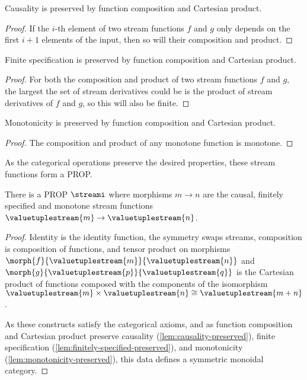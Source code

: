 \begin{lemma}\label{lem:causality-preserved}
    Causality is preserved by function composition and Cartesian product.
\end{lemma}
\begin{proof}
    If the \(i\)-th element of two stream functions \(f\) and \(g\) only depends
    on the first \(i+1\) elements of the input, then so will their composition
    and product.
\end{proof}

\begin{lemma}\label{lem:finitely-specified-preserved}
    Finite specification is preserved by function composition and Cartesian
    product.
\end{lemma}
\begin{proof}
    For both the composition and product of two stream functions \(f\) and
    \(g\), the largest the set of stream derivatives could be is the product of
    stream derivatives of \(f\) and \(g\), so this will also be finite.
\end{proof}

\begin{lemma}\label{lem:monotonicity-preserved}
    Monotonicity is preserved by function composition and Cartesian product.
\end{lemma}
\begin{proof}
    The composition and product of any monotone function is monotone.
\end{proof}

As the categorical operations preserve the desired properties, these stream
functions form a PROP.

\begin{proposition}
    There is a PROP \(\streami\) where morphisms \(m \to n\) are the causal,
    finitely specified and monotone stream functions \(
    \valuetuplestream{m} \to \valuetuplestream{n}
    \).
\end{proposition}
\begin{proof}
    Identity is the identity function, the symmetry swaps streams, composition
    is composition of functions, and tensor product on morphisms
    \(\morph{f}{\valuetuplestream{m}}{\valuetuplestream{n}}\) and
    \(\morph{g}{\valuetuplestream{p}}{\valuetuplestream{q}}\) is the Cartesian
    product of functions composed with the components of the isomorphism
    \(\valuetuplestream{m} \times \valuetuplestream{n}
    \cong \valuetuplestream{m+n}\).

    As these constructs satisfy the categorical axioms, and as function
    composition and Cartesian product preserve causality
    (\cref{lem:causality-preserved}),
    finite specification (\cref{lem:finitely-specified-preserved}),
    and monotonicity (\cref{lem:monotonicity-preserved}), this data defines a
    symmetric monoidal category.
\end{proof}

